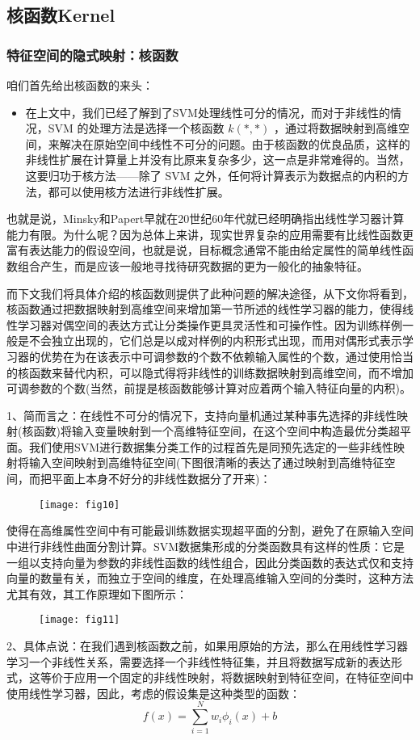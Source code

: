 \documentclass[a4paper,12pt]{article}
\begin{document}
\subsection{核函数Kernel}
\subsubsection{特征空间的隐式映射：核函数}
咱们首先给出核函数的来头：

\begin{itemize}
  \item 在上文中，我们已经了解到了SVM处理线性可分的情况，而对于非线性的情况，SVM 的处理方法是选择一个核函数 $k(*,*)$ ，通过将数据映射到高维空间，来解决在原始空间中线性不可分的问题。由于核函数的优良品质，这样的非线性扩展在计算量上并没有比原来复杂多少，这一点是非常难得的。当然，这要归功于核方法——除了 SVM 之外，任何将计算表示为数据点的内积的方法，都可以使用核方法进行非线性扩展。
\end{itemize}

也就是说，Minsky和Papert早就在20世纪60年代就已经明确指出线性学习器计算能力有限。为什么呢？因为总体上来讲，现实世界复杂的应用需要有比线性函数更富有表达能力的假设空间，也就是说，目标概念通常不能由给定属性的简单线性函数组合产生，而是应该一般地寻找待研究数据的更为一般化的抽象特征。

而下文我们将具体介绍的核函数则提供了此种问题的解决途径，从下文你将看到，核函数通过把数据映射到高维空间来增加第一节所述的线性学习器的能力，使得线性学习器对偶空间的表达方式让分类操作更具灵活性和可操作性。因为训练样例一般是不会独立出现的，它们总是以成对样例的内积形式出现，而用对偶形式表示学习器的优势在为在该表示中可调参数的个数不依赖输入属性的个数，通过使用恰当的核函数来替代内积，可以隐式得将非线性的训练数据映射到高维空间，而不增加可调参数的个数(当然，前提是核函数能够计算对应着两个输入特征向量的内积)。

1、简而言之：在线性不可分的情况下，支持向量机通过某种事先选择的非线性映射(核函数)将输入变量映射到一个高维特征空间，在这个空间中构造最优分类超平面。我们使用SVM进行数据集分类工作的过程首先是同预先选定的一些非线性映射将输入空间映射到高维特征空间(下图很清晰的表达了通过映射到高维特征空间，而把平面上本身不好分的非线性数据分了开来)：

\begin{figure}[H]
  \centering
  \texttt{[image: fig10]}
\end{figure}
 使得在高维属性空间中有可能最训练数据实现超平面的分割，避免了在原输入空间中进行非线性曲面分割计算。SVM数据集形成的分类函数具有这样的性质：它是一组以支持向量为参数的非线性函数的线性组合，因此分类函数的表达式仅和支持向量的数量有关，而独立于空间的维度，在处理高维输入空间的分类时，这种方法尤其有效，其工作原理如下图所示：
 \begin{figure}[H]
   \centering
   \texttt{[image: fig11]}
 \end{figure}
2、具体点说：在我们遇到核函数之前，如果用原始的方法，那么在用线性学习器学习一个非线性关系，需要选择一个非线性特征集，并且将数据写成新的表达形式，这等价于应用一个固定的非线性映射，将数据映射到特征空间，在特征空间中使用线性学习器，因此，考虑的假设集是这种类型的函数：
\begin{equation}
  f(x)=\sum_{i=1}^Nw_i\phi_i(x)+b
\end{equation}
\end{document}
